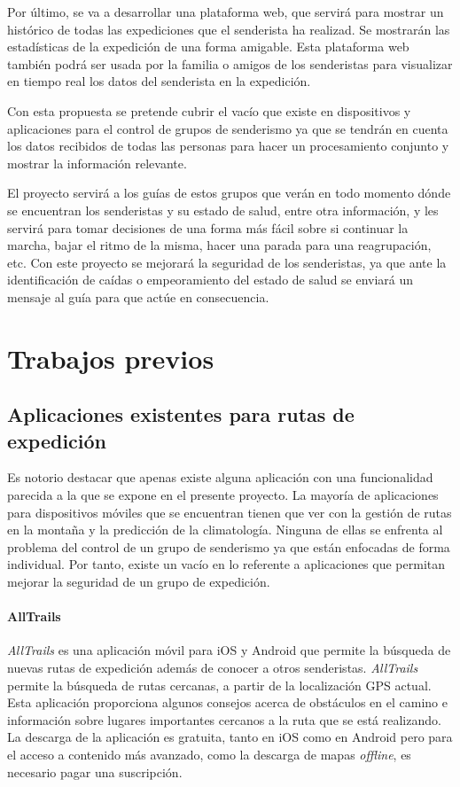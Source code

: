 Por último, se va a desarrollar una plataforma web, que servirá para mostrar un histórico de todas las expediciones que el senderista ha realizad. Se mostrarán las estadísticas de la expedición de una forma amigable. Esta plataforma web también podrá ser usada por la familia o amigos de los senderistas para visualizar en tiempo real los datos del senderista en la expedición. 

Con esta propuesta se pretende cubrir el vacío que existe en dispositivos y aplicaciones para el control de grupos de senderismo ya que se tendrán en cuenta los datos recibidos de todas las personas para hacer un procesamiento conjunto y mostrar la información relevante. 

El proyecto servirá a los guías de estos grupos que verán en todo momento dónde se encuentran los senderistas y su estado de salud, entre otra información, y les servirá para tomar decisiones de una forma más fácil sobre si continuar la marcha, bajar el ritmo de la misma, hacer una parada para una reagrupación, etc. Con este proyecto se mejorará la seguridad de los senderistas, ya que ante la identificación de caídas \cite{7} o empeoramiento del estado de salud se enviará un mensaje al guía para que actúe en consecuencia. 

\section{Trabajos previos}

\subsection{Aplicaciones existentes para rutas de expedición}

Es notorio destacar que apenas existe alguna aplicación con una funcionalidad parecida a la que se expone en el presente proyecto. La mayoría de aplicaciones para dispositivos móviles que se encuentran tienen que ver con la gestión de rutas en la montaña y la predicción de la climatología. Ninguna de ellas se enfrenta al problema del control de un grupo de senderismo ya que están enfocadas de forma individual. Por tanto, existe un vacío en lo referente a aplicaciones que permitan mejorar la seguridad de un grupo de expedición.

\paragraph{AllTrails}

\textit{AllTrails} es una aplicación móvil para iOS y Android que permite la búsqueda de nuevas rutas de expedición además de conocer a otros senderistas. \textit{AllTrails} permite la búsqueda de rutas cercanas, a partir de la localización \ac{GPS} actual. Esta aplicación proporciona algunos consejos acerca de obstáculos en el camino e información sobre lugares importantes cercanos a la ruta que se está realizando. La descarga de la aplicación es gratuita, tanto en iOS como en Android pero para el acceso a contenido más avanzado, como la descarga de mapas \textit{offline}, es necesario pagar una suscripción.

